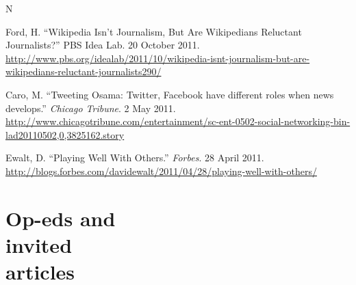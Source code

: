 \documentclass{cv}
\begin{document}
\begin{entries}{N}
		\item Ford, H. ``Wikipedia Isn't Journalism, But Are Wikipedians Reluctant Journalists?'' PBS Idea Lab. 20 October 2011. \url{http://www.pbs.org/idealab/2011/10/wikipedia-isnt-journalism-but-are-wikipedians-reluctant-journalists290/}
		\item Caro, M. ``Tweeting Osama: Twitter, Facebook have different roles when news develops.'' \textit{Chicago Tribune}. 2 May 2011. \url{http://www.chicagotribune.com/entertainment/sc-ent-0502-social-networking-bin-lad20110502,0,3825162.story}
		\item Ewalt, D. ``Playing Well With Others.'' \textit{Forbes}. 28 April 2011. \url{http://blogs.forbes.com/davidewalt/2011/04/28/playing-well-with-others/}
	\end{entries}

	\section{Op-eds and\\invited\\articles}
\end{document}
